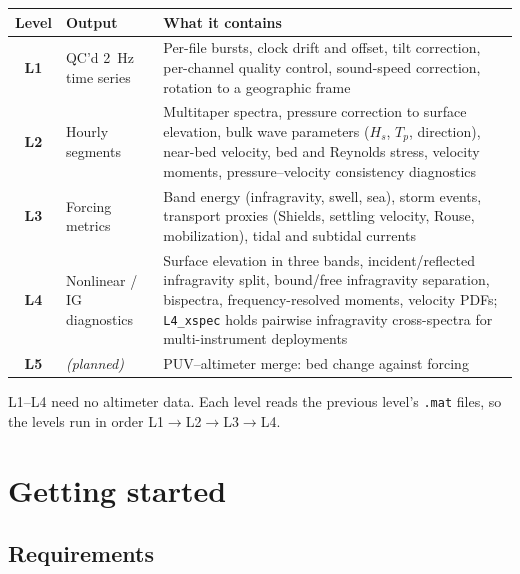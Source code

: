 \documentclass[11pt]{article}
\newcommand{\code}[1]{\texttt{#1}}
\begin{document}
\begin{center}
\begin{tabular}{@{}c l p{9.3cm}@{}}
\toprule
Level & Output & What it contains \\
\midrule
\textbf{L1} & QC'd 2~Hz time series & Per-file bursts, clock drift and offset, tilt correction,
  per-channel quality control, sound-speed correction, rotation to a geographic frame \\
\textbf{L2} & Hourly segments & Multitaper spectra, pressure correction to surface elevation,
  bulk wave parameters ($H_s$, $T_p$, direction), near-bed velocity, bed and Reynolds stress,
  velocity moments, pressure--velocity consistency diagnostics \\
\textbf{L3} & Forcing metrics & Band energy (infragravity, swell, sea), storm events,
  transport proxies (Shields, settling velocity, Rouse, mobilization), tidal and subtidal
  currents \\
\textbf{L4} & Nonlinear / IG diagnostics & Surface elevation in three bands,
  incident/reflected infragravity split, bound/free infragravity separation, bispectra,
  frequency-resolved moments, velocity PDFs; \code{L4\_xspec} holds pairwise infragravity
  cross-spectra for multi-instrument deployments \\
\textbf{L5} & \emph{(planned)} & PUV--altimeter merge: bed change against forcing \\
\bottomrule
\end{tabular}
\end{center}

\noindent
L1--L4 need no altimeter data. Each level reads the previous level's \code{.mat} files, so the
levels run in order L1$\rightarrow$L2$\rightarrow$L3$\rightarrow$L4.

\section{Getting started}
\label{sec:start}

\subsection{Requirements}
\end{document}
